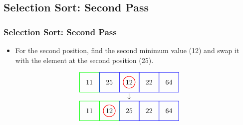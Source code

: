 \documentclass{beamer}
\begin{document}
\subsection{Selection Sort: Second Pass}
\begin{frame}[c, fragile]
\frametitle{Selection Sort: Second Pass}

\begin{itemize}
    \item For the second position, find the second minimum value (12) and swap it with the element at the second position (25).
\end{itemize}

\[
\begin{array}{c}
\begin{tikzpicture}[baseline=(current bounding box.center)]
    \node at (0,0) {11};
    \node at (1,0) {25};
    \node at (2,0) {12};
    \node at (3,0) {22};
    \node at (4,0) {64};
    \draw[red, thick] (2,0) circle (0.3);
    \draw[green, thick] (-0.5,-0.5) rectangle (0.5,0.5);
    \draw[blue, thick] (0.5,-0.5) rectangle (1.5,0.5);
    \draw[blue, thick] (1.5,-0.5) rectangle (2.5,0.5);
    \draw[blue, thick] (2.5,-0.5) rectangle (3.5,0.5);
    \draw[blue, thick] (3.5,-0.5) rectangle (4.5,0.5);
\end{tikzpicture} \\
\downarrow \\
\begin{tikzpicture}[baseline=(current bounding box.center)]
    \node at (0,0) {11};
    \node at (1,0) {12};
    \node at (2,0) {25};
    \node at (3,0) {22};
    \node at (4,0) {64};
    \draw[red, thick] (1,0) circle (0.3);
    \draw[green, thick] (-0.5,-0.5) rectangle (0.5,0.5);
    \draw[green, thick] (0.5,-0.5) rectangle (1.5,0.5);
    \draw[blue, thick] (1.5,-0.5) rectangle (2.5,0.5);
    \draw[blue, thick] (2.5,-0.5) rectangle (3.5,0.5);
    \draw[blue, thick] (3.5,-0.5) rectangle (4.5,0.5);
\end{tikzpicture}
\end{array}
\]

\end{frame}
\end{document}
